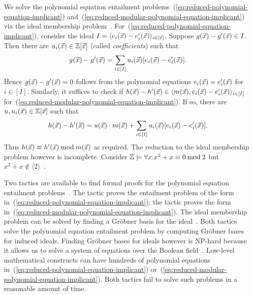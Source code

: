 We solve the polynomial equation entailment
problems~(\ref{eq:reduced-polynomial-equation-implicant})
and~(\ref{eq:reduced-modular-polynomial-equation-implicant}) via
the ideal membership problem~\cite{H:07:AENTP,BS:16:GFEV}.
For~(\ref{eq:reduced-polynomial-equation-implicant}), consider the
ideal $I = \langle e_i(\vec{x}) - e'_i(\vec{x}) \rangle_{i \in [I]}$. Suppose
$g(\vec{x}) - g'(\vec{x}) \in I$. Then there are $u_i(\vec{x}) \in \mathbb{Z}[\vec{x}]$
(called \emph{coefficients}) such that
\begin{equation}
  \label{eq:reduced-polynomial-equation-witnesses}
  g(\vec{x}) - g'(\vec{x}) = \sum\limits_{i \in [I]} u_i (\vec{x}) [e_i (\vec{x}) - e'_i (\vec{x})].
\end{equation}
Hence $g(\vec{x}) - g'(\vec{x}) = 0$ follows from  the polynomial equations
$e_i (\vec{x}) = e'_i (\vec{x})$ for $i \in [I]$. Similarly, it
suffices to check if $h(\vec{x}) - h'(\vec{x}) \in \langle m(\vec{x}), e_i(\vec{x}) -
e'_i(\vec{x}) \rangle_{i \in [I]}$
for~(\ref{eq:reduced-modular-polynomial-equation-implicant}).
If so, there are $u, u_i(\vec{x}) \in \mathbb{Z}[\vec{x}]$ such that
\begin{equation}
  \label{eq:reduced-modular-polynomial-equation-witnesses}
  h(\vec{x}) - h'(\vec{x}) = u(\vec{x}) \cdot m(\vec{x}) + \sum\limits_{i \in [I]} u_i (\vec{x})
  [e_i (\vec{x}) - e'_i (\vec{x})].
\end{equation}
Thus $h(\vec{x}) \equiv h'(\vec{x}) \mathbin{\textmd{mod}} m(\vec{x})$ as required.
The reduction to the ideal membership problem however is
incomplete. Consider $\mathbb{Z} \models \forall x. x^2 + x
\equiv 0 \mathbin{\textmd{mod}} 2$ but $x^2 + x \not\in \langle 2
\rangle$~\cite{H:07:AENTP}.

Two \coq tactics are available to
find formal proofs for the polynomial equation entailment
problems~\cite{P:08:CGBP,P:10:CGBP}. 
The tactic  proves the entailment problem of
the form in~(\ref{eq:reduced-polynomial-equation-implicant}); the
tactic  proves the form
in~(\ref{eq:reduced-modular-polynomial-equation-implicant}). 
The ideal membership problem can be solved by finding a Gr\"obner
basis for the ideal~\cite{C:96:CCANT}. 
Both tactics solve the polynomial equation entailment problem by
computing Gr\"obner bases for induced ideals. Finding Gr\"obner bases
for ideals however is NP-hard because it allows us to solve a
system of equations over the Boolean field~\cite{GJ:1979:CAI}. 
Low-level mathematical constructs can have
hundreds of polynomial equations 
in~(\ref{eq:reduced-polynomial-equation-implicant})
or~(\ref{eq:reduced-modular-polynomial-equation-implicant}). 
Both \coq tactics fail to solve such problems in a reasonable
amount of time. 

